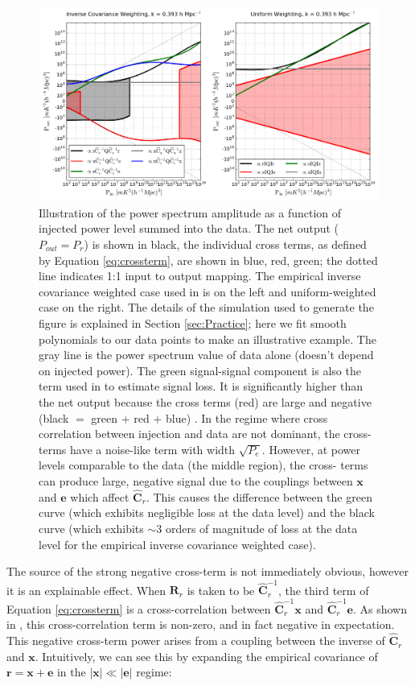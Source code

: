 \documentclass[preprint2,numberedappendix,tighten]{aastex6}  %
\begin{document}
\begin{figure}
	\centering
	\includegraphics[width=1\textwidth]{plots/sigloss_terms.png}
	\caption{Illustration of the power spectrum amplitude as a function of injected power level summed into the 
data. The net output ($P_{out}=P_r$) is shown in black, the individual cross terms, as defined by Equation 
\eqref{eq:crossterm},  are shown in blue, red, green; the dotted line indicates 1:1 input to output mapping.  The 
empirical inverse covariance weighted case used in \citealt{ali_et_al2015} is on the left and uniform-weighted 
case on the right. The details of the simulation used to generate the figure is explained in Section 
\ref{sec:Practice}; here we fit smooth polynomials to our data points to make an illustrative example.   The gray 
line is the power spectrum value of data alone (doesn't depend on injected power). The green signal-signal 
component is also the term used in  to estimate signal loss. It is significantly higher 
than the net output because the cross terms (red) are large and negative (black $=$ green $+$ red $+$ blue) . In the 
regime where cross correlation between injection and data are not dominant, the cross-terms have a noise-like 
term with width $\sqrt{P_e}$. However, at power levels comparable to the data (the middle region), the cross-
terms can produce large, negative signal due to the couplings between $\textbf{x}$ and $\textbf{e}$ which affect 
$\widehat{\textbf{C}}_{r}$. This causes the difference between the green curve (which exhibits negligible loss at 
the data level) and the black curve (which exhibits $\sim$$3$ orders of magnitude of loss at the data level for 
the empirical inverse covariance weighted case). }
	\label{fig:sigloss_terms}
\end{figure}

The source of the strong negative cross-term is not immediately obvious, however it is an explainable effect. 
When $\textbf{R}_{r}$
is taken to be $\widehat{\textbf{C}}_{r}^{-1}$, the third term of Equation \eqref{eq:crossterm} is a cross-correlation between $\widehat{\textbf{C}}_{r}^{-1}\textbf{x}$ and
$\widehat{\textbf{C}}_{r}^{-1}\textbf{e}$. As shown in \citet{switzer_et_al2015}, this cross-correlation term is non-zero, and in fact negative in expectation. 
This negative cross-term power arises from a coupling between the inverse of 
$\widehat{\textbf{C}}_{r}$ and $\mathbf{x}$. 
Intuitively, we can see this by expanding the empirical covariance of $\textbf{r}=\textbf{x}+\textbf{e}$ in the
$|\textbf{x}|\ll|\textbf{e}|$ regime:
\end{document}
